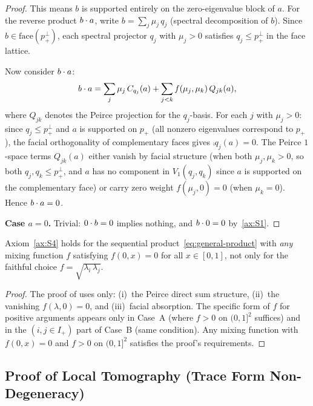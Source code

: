 \begin{proof}
This means $b$ is supported entirely on the zero-eigenvalue block of
$a$.  For the reverse product $\sp{b}{a}$, write
$b = \sum_{j} \mu_{j}\, q_{j}$ (spectral decomposition of $b$).
Since $b \in \mathrm{face}(p_{+}^{\perp})$, each spectral
projector $q_{j}$ with $\mu_{j} > 0$ satisfies
$q_{j} \leq p_{+}^{\perp}$ in the face lattice.

Now consider $\sp{b}{a}$:
\[
  \sp{b}{a} = \sum_{j} \mu_{j}\, \comp{q_{j}}(a)
  + \sum_{j < k} f(\mu_{j}, \mu_{k})\, Q_{jk}(a),
\]
where $Q_{jk}$ denotes the Peirce projection for the $q_{j}$-basis.
For each $j$ with $\mu_{j} > 0$: since $q_{j} \leq p_{+}^{\perp}$
and $a$ is supported on $p_{+}$ (all nonzero eigenvalues correspond to
$p_{+}$), the facial orthogonality of complementary faces gives
$\comp{q_{j}}(a) = 0$.  The Peirce $1$-space terms $Q_{jk}(a)$ either
vanish by facial structure (when both $\mu_{j}, \mu_{k} > 0$,
so both $q_{j}, q_{k} \leq p_{+}^{\perp}$, and $a$ has no component
in $V_{1}(q_{j}, q_{k})$ since $a$ is supported on the complementary
face) or carry zero weight $f(\mu_{j}, 0) = 0$ (when $\mu_{k} = 0$).
Hence $\sp{b}{a} = 0$.

\medskip
\noindent\textbf{Case $a = 0$.}  Trivial: $\sp{0}{b} = 0$ implies
nothing, and $\sp{b}{0} = 0$ by~\ref{ax:S1}.
\end{proof}

\begin{corollary}
\label{cor:S4-phi-indep}
Axiom~\ref{ax:S4} holds for the sequential
product~\eqref{eq:general-product} with \emph{any} mixing function $f$
satisfying $f(0, x) = 0$ for all $x \in [0,1]$, not only for the
faithful choice $f = \sqrt{\lambda_{i}\, \lambda_{j}}$.
\end{corollary}

\begin{proof}
The proof of  uses only: (i)~the Peirce direct sum
structure, (ii)~the vanishing $f(\lambda, 0) = 0$, and (iii)~facial
absorption.  The specific form of $f$ for positive arguments appears
only in Case~A (where $f > 0$ on $(0,1]^{2}$ suffices) and in the
$(i, j \in I_{+})$ part of Case~B (same condition).  Any mixing
function with $f(0, x) = 0$ and $f > 0$ on $(0,1]^{2}$ satisfies the
proof's requirements.
\end{proof}


\subsection{Proof of Local Tomography (Trace Form Non-Degeneracy)}
\label{app:lt-proof}

